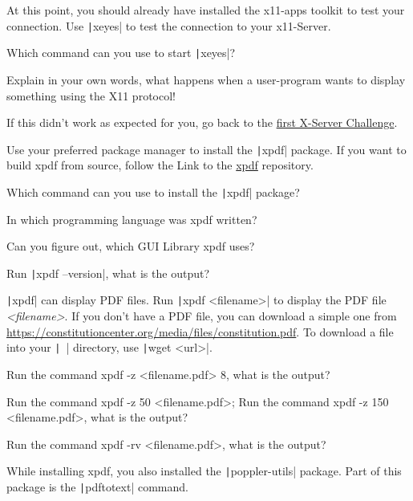 \begin{challenge}
\begin{task}
At this point, you should already have installed the x11-apps toolkit to test your connection. 
Use \texttt|xeyes| to test the connection to your x11-Server.
\begin{questions}
\item Which command can you use to start \texttt|xeyes|?
\item Explain in your own words, what happens when a user-program wants to display something using the X11 protocol!
\end{questions}
If this didn't work as expected for you, go back to the \href{https://www.github.com/STEMgraph/<uuid>}{first X-Server Challenge}.
\end{task}

\begin{task}
    Use your preferred package manager to install the \texttt|xpdf| package.
    If you want to build xpdf from source, follow the Link to the \href{https://gitlab.com/xpdf-mirror/xpdf}{xpdf} repository.

\begin{questions}
    \item Which command can you use to install the \texttt|xpdf| package?
    \item In which programming language was xpdf written?
    \item Can you figure out, which GUI Library xpdf uses?
    \item Run \texttt|xpdf --version|, what is the output?
\end{questions}
\end{task}

\begin{task}
    \texttt|xpdf| can display PDF files.
    Run \texttt|xpdf <filename>| to display the PDF file \textit{<filename>}.
    If you don't have a PDF file, you can download a simple one from \href{https://constitutioncenter.org/media/files/constitution.pdf}{https://constitutioncenter.org/media/files/constitution.pdf}.
    To download a file into your \texttt|~| directory, use \texttt|wget <url>|.

\begin{questions}
    \item Run the command xpdf -z <filename.pdf> 8, what is the output?
    \item Run the command xpdf -z 50 <filename.pdf>; Run the command xpdf -z 150 <filename.pdf>, what is the output?
    \item Run the command xpdf -rv <filename.pdf>, what is the output?
\end{questions}
\end{task}
\begin{task}
    While installing xpdf, you also installed the \texttt|poppler-utils| package.
    Part of this package is the \texttt|pdftotext| command.


\end{task}
\end{challenge}
